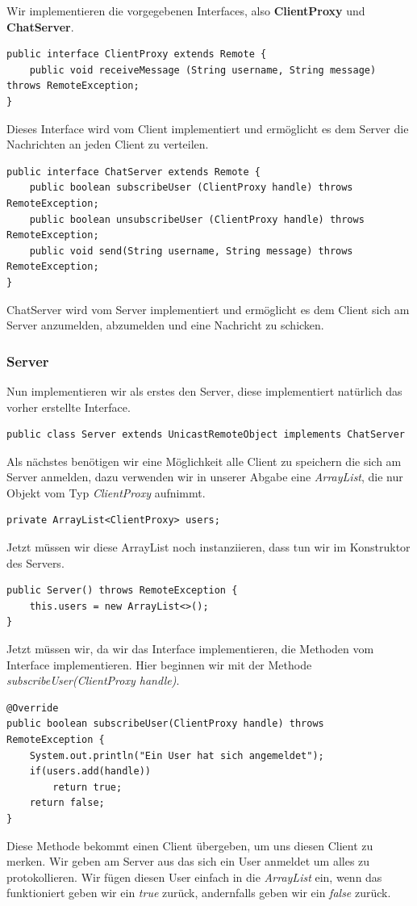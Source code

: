 Wir implementieren die vorgegebenen Interfaces, also \textbf{ClientProxy} und \textbf{ChatServer}.
\begin{lstlisting}
public interface ClientProxy extends Remote {
    public void receiveMessage (String username, String message) throws RemoteException;
}
\end{lstlisting}
Dieses Interface wird vom Client implementiert und ermöglicht es dem Server die Nachrichten an jeden Client zu verteilen.
\begin{lstlisting}
public interface ChatServer extends Remote {
    public boolean subscribeUser (ClientProxy handle) throws RemoteException;
    public boolean unsubscribeUser (ClientProxy handle) throws RemoteException;
    public void send(String username, String message) throws RemoteException;
}
\end{lstlisting}
ChatServer wird vom Server implementiert und ermöglicht es dem Client sich am Server anzumelden, abzumelden und eine Nachricht zu schicken.

\subsubsection{Server}
Nun implementieren wir als erstes den Server, diese implementiert natürlich das vorher erstellte Interface.
\begin{lstlisting}
public class Server extends UnicastRemoteObject implements ChatServer 
\end{lstlisting}
Als nächstes benötigen wir eine Möglichkeit alle Client zu speichern die sich am Server anmelden, dazu verwenden wir in unserer Abgabe eine \textit{ArrayList}, die nur Objekt vom Typ \textit{ClientProxy} aufnimmt.
\begin{lstlisting}
private ArrayList<ClientProxy> users;
\end{lstlisting}
Jetzt müssen wir diese ArrayList noch instanziieren, dass tun wir im Konstruktor des Servers.
\begin{lstlisting}
public Server() throws RemoteException {
	this.users = new ArrayList<>();
}
\end{lstlisting}


Jetzt müssen wir, da wir das Interface implementieren, die Methoden vom Interface implementieren. Hier beginnen wir mit der Methode \textit{subscribeUser(ClientProxy handle)}. 
\begin{lstlisting}
@Override
public boolean subscribeUser(ClientProxy handle) throws RemoteException {
	System.out.println("Ein User hat sich angemeldet");
	if(users.add(handle))
		return true;
	return false;
}
\end{lstlisting}
Diese Methode bekommt einen Client übergeben, um uns diesen Client zu merken. Wir geben am Server aus das sich ein User anmeldet um alles zu protokollieren. Wir fügen diesen User einfach in die \textit{ArrayList} ein, wenn das funktioniert geben wir ein \textit{true} zurück, andernfalls geben wir ein \textit{false} zurück.

